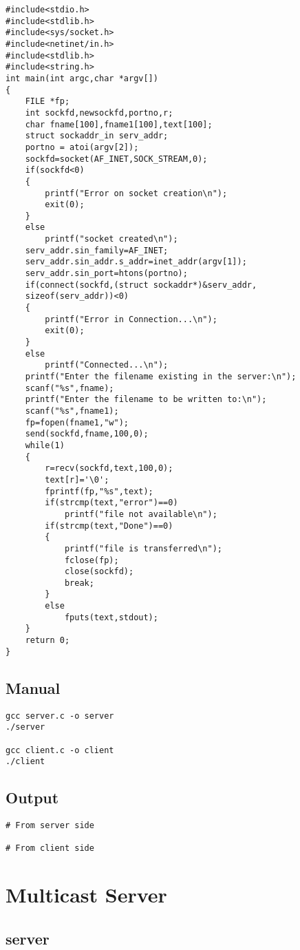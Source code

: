 \documentclass[12pt]{article}
\begin{document}
\begin{lstlisting}
#include<stdio.h>
#include<stdlib.h> 
#include<sys/socket.h> 
#include<netinet/in.h> 
#include<stdlib.h>
#include<string.h>
int main(int argc,char *argv[]) 
{ 
	FILE *fp;
	int sockfd,newsockfd,portno,r;
	char fname[100],fname1[100],text[100];
	struct sockaddr_in serv_addr;
	portno = atoi(argv[2]);
	sockfd=socket(AF_INET,SOCK_STREAM,0);
	if(sockfd<0)
	{
		printf("Error on socket creation\n");
		exit(0);
	}
	else
		printf("socket created\n");
	serv_addr.sin_family=AF_INET; 
	serv_addr.sin_addr.s_addr=inet_addr(argv[1]);
	serv_addr.sin_port=htons(portno); 
	if(connect(sockfd,(struct sockaddr*)&serv_addr,
	sizeof(serv_addr))<0) 
	{
		printf("Error in Connection...\n"); 
		exit(0);
	}
	else 
		printf("Connected...\n"); 
	printf("Enter the filename existing in the server:\n");
	scanf("%s",fname);
	printf("Enter the filename to be written to:\n");
	scanf("%s",fname1);
	fp=fopen(fname1,"w");
	send(sockfd,fname,100,0);
	while(1)
	{
		r=recv(sockfd,text,100,0);
		text[r]='\0';
		fprintf(fp,"%s",text);
		if(strcmp(text,"error")==0)
			printf("file not available\n");
		if(strcmp(text,"Done")==0)
		{
			printf("file is transferred\n");
			fclose(fp);
			close(sockfd);
			break;
		}
		else
			fputs(text,stdout);
	}
	return 0;
}
\end{lstlisting}

\subsection{Manual}

\begin{lstlisting}
gcc server.c -o server
./server

gcc client.c -o client
./client
\end{lstlisting}

\subsection{Output}

\begin{lstlisting}
# From server side

# From client side
\end{lstlisting}

\section{Multicast Server}
\subsection{server}
\end{document}
